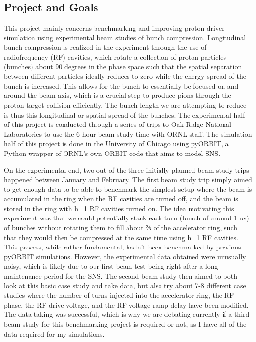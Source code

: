 \documentclass[12pt]{article}
\begin{document}
\subsection{Project and Goals}
\par\noindent This project mainly concerns benchmarking and improving proton driver simulation using experimental beam studies of bunch compression. Longitudinal bunch compression is realized in the experiment through the use of radiofrequency (RF) cavities, which rotate a collection of proton particles (bunches) about 90 degrees in the phase space such that the spatial separation between different particles ideally reduces to zero while the energy spread of the bunch is increased. This allows for the bunch to essentially be focused on and around the beam axis, which is a crucial step to produce pions through the proton-target collision efficiently. The bunch length we are attempting to reduce is thus this longitudinal or spatial spread of the bunches. The experimental half of this project is conducted through a series of trips to Oak Ridge National Laboratories to use the 6-hour beam study time with ORNL staff. The simulation half of this project is done in the University of Chicago using pyORBIT, a Python wrapper of ORNL’s own ORBIT code that aims to model SNS. 
\par\noindent On the experimental end, two out of the three initially planned beam study trips happened between January and February. The first beam study trip simply aimed to get enough data to be able to benchmark the simplest setup where the beam is accumulated in the ring when the RF cavities are turned off, and the beam is stored in the ring with h=1 RF cavities turned on. The idea motivating this experiment was that we could potentially stack each turn (bunch of around 1 us) of bunches without rotating them to fill about ⅔ of the accelerator ring, such that they would then be compressed at the same time using h=1 RF cavities. This process, while rather fundamental, hadn’t been benchmarked by previous pyORBIT simulations. However, the experimental data obtained were unusually noisy, which is likely due to our first beam test being right after a long maintenance period for the SNS. The second beam study then aimed to both look at this basic case study and take data, but also try about 7-8 different case studies where the number of turns injected into the accelerator ring, the RF phase, the RF drive voltage, and the RF voltage ramp delay have been modified. The data taking was successful, which is why we are debating currently if a third beam study for this benchmarking project is required or not, as I have all of the data required for my simulations.
\end{document}
